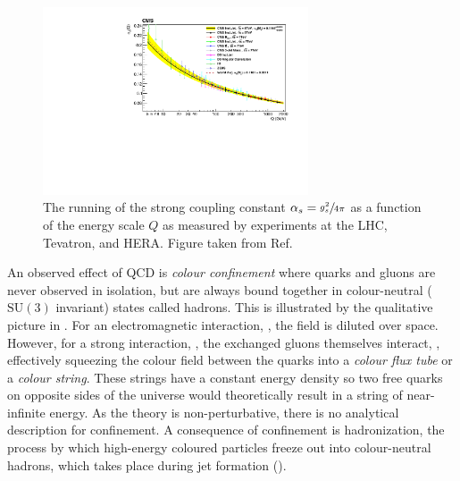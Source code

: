 \begin{figure}[h]
    \centering
    \includegraphics[width=0.7\textwidth]{Figures/standard_model/running}
    \caption{The running of the strong coupling constant $\alpha_s = \sfrac{g_s^2}{4\pi}$ as a function of the energy scale $Q$ as measured by experiments at the LHC, Tevatron, and HERA. Figure taken from Ref.~\cite{CMSRunning}}
    \label{fig:asymptotic_freedom}
\end{figure}

An observed effect of QCD is \textit{colour confinement} where quarks and gluons are never observed in isolation, but are always bound together in colour-neutral ($\text{SU}(3)$ invariant) states called hadrons.
This is illustrated by the qualitative picture in .
For an electromagnetic interaction, , the field is diluted over space.
However, for a strong interaction, , the exchanged gluons themselves interact, , effectively squeezing the colour field between the quarks into a \textit{colour flux tube} or a \textit{colour string}.
These strings have a constant energy density so two free quarks on opposite sides of the universe would theoretically result in a string of near-infinite energy.
As the theory is non-perturbative, there is no analytical description for confinement.
A consequence of confinement is hadronization, the process by which high-energy coloured particles freeze out into colour-neutral hadrons, which takes place during jet formation ().

